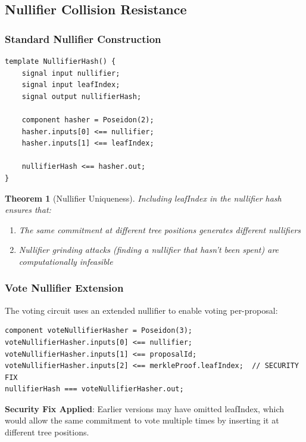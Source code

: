 \documentclass[11pt,a4paper]{article}
\newtheorem{theorem}{Theorem}[section]
\begin{document}
\subsection{Nullifier Collision Resistance}

\subsubsection{Standard Nullifier Construction}

\begin{lstlisting}[style=circom, caption={Nullifier Hash Construction (poseidon.circom:45-57)}]
template NullifierHash() {
    signal input nullifier;
    signal input leafIndex;
    signal output nullifierHash;

    component hasher = Poseidon(2);
    hasher.inputs[0] <== nullifier;
    hasher.inputs[1] <== leafIndex;

    nullifierHash <== hasher.out;
}
\end{lstlisting}

\begin{theorem}[Nullifier Uniqueness]
Including leafIndex in the nullifier hash ensures that:
\begin{enumerate}
    \item The same commitment at different tree positions generates different nullifiers
    \item Nullifier grinding attacks (finding a nullifier that hasn't been spent) are computationally infeasible
\end{enumerate}
\end{theorem}

\subsubsection{Vote Nullifier Extension}

The voting circuit uses an extended nullifier to enable voting per-proposal:

\begin{lstlisting}[style=circom, caption={Vote Nullifier (vote.circom:97-101)}]
component voteNullifierHasher = Poseidon(3);
voteNullifierHasher.inputs[0] <== nullifier;
voteNullifierHasher.inputs[1] <== proposalId;
voteNullifierHasher.inputs[2] <== merkleProof.leafIndex;  // SECURITY FIX
nullifierHash === voteNullifierHasher.out;
\end{lstlisting}

\textbf{Security Fix Applied}: Earlier versions may have omitted leafIndex, which would allow the same commitment to vote multiple times by inserting it at different tree positions.
\end{document}
